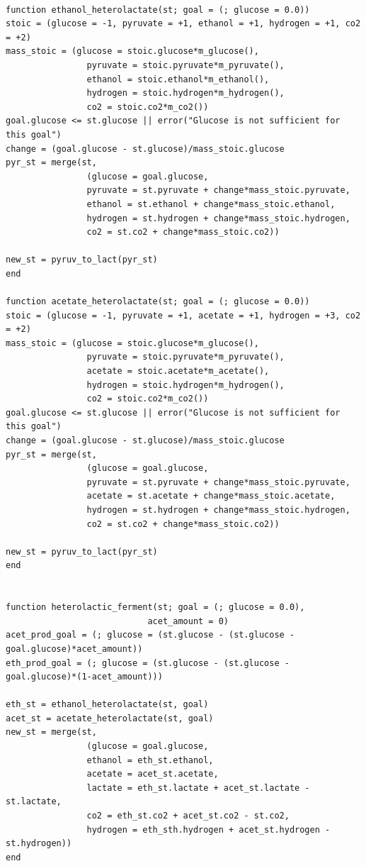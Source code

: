 \documentclass[11pt]{article}
\begin{document}
\begin{verbatim}

function ethanol_heterolactate(st; goal = (; glucose = 0.0))
stoic = (glucose = -1, pyruvate = +1, ethanol = +1, hydrogen = +1, co2 = +2)
mass_stoic = (glucose = stoic.glucose*m_glucose(),
                pyruvate = stoic.pyruvate*m_pyruvate(),
                ethanol = stoic.ethanol*m_ethanol(),
                hydrogen = stoic.hydrogen*m_hydrogen(),
                co2 = stoic.co2*m_co2())
goal.glucose <= st.glucose || error("Glucose is not sufficient for this goal")
change = (goal.glucose - st.glucose)/mass_stoic.glucose
pyr_st = merge(st,
                (glucose = goal.glucose,
                pyruvate = st.pyruvate + change*mass_stoic.pyruvate,
                ethanol = st.ethanol + change*mass_stoic.ethanol,
                hydrogen = st.hydrogen + change*mass_stoic.hydrogen,
                co2 = st.co2 + change*mass_stoic.co2))

new_st = pyruv_to_lact(pyr_st)
end

function acetate_heterolactate(st; goal = (; glucose = 0.0))
stoic = (glucose = -1, pyruvate = +1, acetate = +1, hydrogen = +3, co2 = +2)
mass_stoic = (glucose = stoic.glucose*m_glucose(),
                pyruvate = stoic.pyruvate*m_pyruvate(),
                acetate = stoic.acetate*m_acetate(),
                hydrogen = stoic.hydrogen*m_hydrogen(),
                co2 = stoic.co2*m_co2())
goal.glucose <= st.glucose || error("Glucose is not sufficient for this goal")
change = (goal.glucose - st.glucose)/mass_stoic.glucose
pyr_st = merge(st,
                (glucose = goal.glucose,
                pyruvate = st.pyruvate + change*mass_stoic.pyruvate,
                acetate = st.acetate + change*mass_stoic.acetate,
                hydrogen = st.hydrogen + change*mass_stoic.hydrogen,
                co2 = st.co2 + change*mass_stoic.co2))

new_st = pyruv_to_lact(pyr_st)
end


function heterolactic_ferment(st; goal = (; glucose = 0.0),
                            acet_amount = 0)
acet_prod_goal = (; glucose = (st.glucose - (st.glucose - goal.glucose)*acet_amount))
eth_prod_goal = (; glucose = (st.glucose - (st.glucose - goal.glucose)*(1-acet_amount)))

eth_st = ethanol_heterolactate(st, goal)
acet_st = acetate_heterolactate(st, goal)
new_st = merge(st,
                (glucose = goal.glucose,
                ethanol = eth_st.ethanol,
                acetate = acet_st.acetate,
                lactate = eth_st.lactate + acet_st.lactate - st.lactate,
                co2 = eth_st.co2 + acet_st.co2 - st.co2,
                hydrogen = eth_sth.hydrogen + acet_st.hydrogen - st.hydrogen))
end

\end{verbatim}
\end{document}
